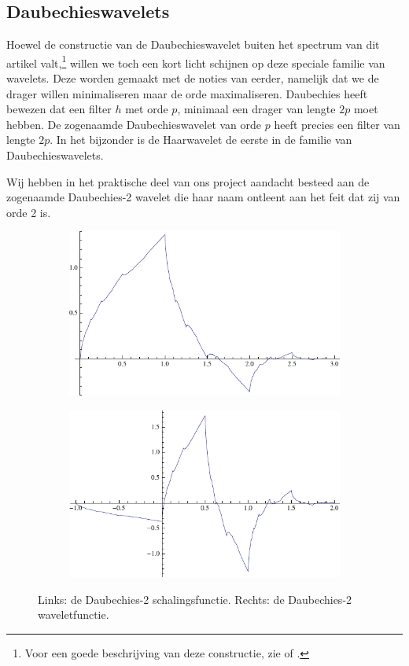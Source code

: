 \subsection{Daubechieswavelets}
Hoewel de constructie van de Daubechieswavelet buiten het spectrum van dit artikel valt,\footnote{Voor een goede beschrijving van deze constructie, zie \cite{mallat} of \cite{daubechies}.} willen we toch een kort licht schijnen op deze speciale familie van wavelets. Deze worden gemaakt met de noties van eerder, namelijk dat we de drager willen minimaliseren maar de orde maximaliseren. Daubechies heeft bewezen\cite{daubechies} dat een filter $h$ met orde $p$, minimaal een drager van lengte $2p$ moet hebben. De zogenaamde Daubechieswavelet van orde $p$ heeft precies een filter van lengte $2p$. In het bijzonder is de Haarwavelet de eerste in de familie van Daubechieswavelets.

Wij hebben in het praktische deel van ons project aandacht besteed aan de zogenaamde Daubechies-2 wavelet die haar naam ontleent aan het feit dat zij van orde 2 is.

\begin{figure}[h]
  \centering
  \begin{subfigure}{0.48\linewidth}
    \includegraphics[width=\linewidth]{plaatjes/db2_phi.pdf}
  \end{subfigure}
  \begin{subfigure}{0.48\linewidth}
    \includegraphics[width=\linewidth]{plaatjes/db2_psi.pdf}
  \end{subfigure}
  \caption{Links: de Daubechies-2 schalingsfunctie. Rechts: de Daubechies-2 waveletfunctie.}
\end{figure}

